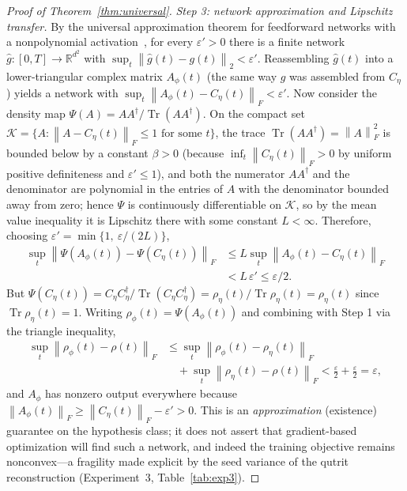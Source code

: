 \documentclass[twocolumn,aps,prxquantum,superscriptaddress,nofootinbib,floatfix,longbibliography]{revtex4-2}
\DeclareMathOperator{\Tr}{Tr}
\newcommand{\R}{\mathbb{R}}
\newcommand{\eps}{\varepsilon}
\newcommand{\norm}[1]{\left\lVert #1 \right\rVert}
\begin{document}
\begin{proof}[Proof of Theorem~\ref{thm:universal}]
\emph{Step 3: network approximation and Lipschitz transfer.} By the universal approximation theorem for feedforward networks with a nonpolynomial activation~\cite{cybenko1989approximation,hornik1991approximation}, for every $\eps'>0$ there is a finite network $\widehat g:[0,T]\to\R^{d^2}$ with $\sup_t\norm{\widehat g(t)-g(t)}_2<\eps'$. Reassembling $\widehat g(t)$ into a lower-triangular complex matrix $A_\phi(t)$ (the same way $g$ was assembled from $C_\eta$) yields a network with $\sup_t\norm{A_\phi(t)-C_\eta(t)}_F<\eps'$. Now consider the density map $\Psi(A)=AA^\dagger/\Tr(AA^\dagger)$. On the compact set $\mathcal{K}=\{A:\norm{A-C_\eta(t)}_F\le1\text{ for some }t\}$, the trace $\Tr(AA^\dagger)=\norm{A}_F^2$ is bounded below by a constant $\beta>0$ (because $\inf_t\norm{C_\eta(t)}_F>0$ by uniform positive definiteness and $\eps'\le1$), and both the numerator $AA^\dagger$ and the denominator are polynomial in the entries of $A$ with the denominator bounded away from zero; hence $\Psi$ is continuously differentiable on $\mathcal{K}$, so by the mean value inequality it is Lipschitz there with some constant $L<\infty$. Therefore, choosing $\eps'=\min\{1,\ \eps/(2L)\}$,
\begin{equation*}
\begin{aligned}
\sup_t\norm{\Psi(A_\phi(t))-\Psi(C_\eta(t))}_F&\le L\sup_t\norm{A_\phi(t)-C_\eta(t)}_F\\
&< L\,\eps'\le\eps/2.
\end{aligned}
\end{equation*}
But $\Psi(C_\eta(t))=C_\eta C_\eta^\dagger/\Tr(C_\eta C_\eta^\dagger)=\rho_\eta(t)/\Tr\rho_\eta(t)=\rho_\eta(t)$ since $\Tr\rho_\eta(t)=1$. Writing $\rho_\phi(t)=\Psi(A_\phi(t))$ and combining with Step 1 via the triangle inequality,
\begin{equation*}
\begin{aligned}
\sup_t\norm{\rho_\phi(t)-\rho(t)}_F&\le\sup_t\norm{\rho_\phi(t)-\rho_\eta(t)}_F\\
&\quad+\sup_t\norm{\rho_\eta(t)-\rho(t)}_F<\tfrac{\eps}{2}+\tfrac{\eps}{2}=\eps,
\end{aligned}
\end{equation*}
and $A_\phi$ has nonzero output everywhere because $\norm{A_\phi(t)}_F\ge\norm{C_\eta(t)}_F-\eps'>0$. This is an \emph{approximation} (existence) guarantee on the hypothesis class; it does not assert that gradient-based optimization will find such a network, and indeed the training objective remains nonconvex---a fragility made explicit by the seed variance of the qutrit reconstruction (Experiment~3, Table~\ref{tab:exp3}).
\end{proof}
\end{document}
